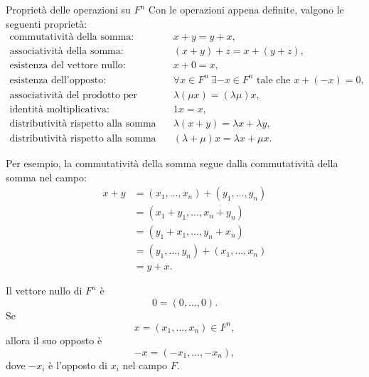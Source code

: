 \documentclass[a4paper]{article}
\begin{document}
\begin{snippetproposition}{Proprietà delle operazioni su \(F^n\)}
    Con le operazioni appena definite, valgono le seguenti proprietà:
    \[
        \begin{array}{ll}
            \text{commutatività della somma:} &
            x+y=y+x,\\[2mm]
            \text{associatività della somma:} &
            (x+y)+z=x+(y+z),\\[2mm]
            \text{esistenza del vettore nullo:} &
            x+0=x,\\[2mm]
            \text{esistenza dell'opposto:} &
            \forall x\in F^n\ \exists -x\in F^n \text{ tale che } x+(-x)=0,\\[2mm]
            \text{associatività del prodotto per scalari:} &
            \lambda(\mu x)=(\lambda\mu)x,\\[2mm]
            \text{identità moltiplicativa:} &
            1x=x,\\[2mm]
            \text{distributività rispetto alla somma di vettori:} &
            \lambda(x+y)=\lambda x+\lambda y,\\[2mm]
            \text{distributività rispetto alla somma di scalari:} &
            (\lambda+\mu)x=\lambda x+\mu x.
        \end{array}
    \]
\end{snippetproposition}

Per esempio, la commutatività della somma segue dalla commutatività della somma nel campo:
\begin{align*}
    x+y
    &=
    (x_1,\ldots,x_n)+(y_1,\ldots,y_n)\\
    &=
    (x_1+y_1,\ldots,x_n+y_n)\\
    &=
    (y_1+x_1,\ldots,y_n+x_n)\\
    &=
    (y_1,\ldots,y_n)+(x_1,\ldots,x_n)\\
    &=
    y+x.
\end{align*}

Il vettore nullo di \(F^n\) è
\[
    0=(0,\ldots,0).
\]
Se
\[
    x=(x_1,\ldots,x_n)\in F^n,
\]
allora il suo opposto è
\[
    -x=(-x_1,\ldots,-x_n),
\]
dove \(-x_i\) è l'opposto di \(x_i\) nel campo \(F\).
\end{document}
